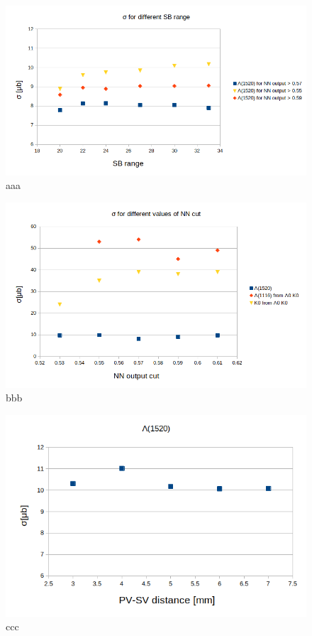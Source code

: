 \begin{figure}
  \centering
  \includegraphics[width=0.9\linewidth]{Chapter_analysis/systematics_SB.png}
  \caption{aaa}
  \label{fig:systematics_SB}
\end{figure}
\begin{figure}
  \centering
  \includegraphics[width=0.9\linewidth]{Chapter_analysis/systematics_NN.png}
  \caption{bbb}
  \label{fig:systematics_NN}
\end{figure}
\begin{figure}
  \centering
  \includegraphics[width=0.9\linewidth]{Chapter_analysis/systematics_PV-SV.png}
  \caption{ccc}
  \label{fig:systematics_PV-SV}
\end{figure}
